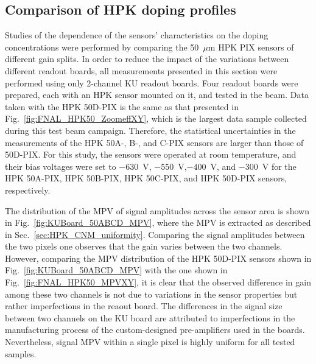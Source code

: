 \documentclass[preprint,1p]{elsarticle}
\begin{document}
\subsection{Comparison of HPK doping profiles}

Studies of the dependence of the sensors' characteristics on the doping
concentrations were performed by comparing the 50~$\mu$m HPK PIX sensors of
different gain splits. In order to reduce the impact of the variations between
different readout boards, all measurements presented in this section were
performed using only 2-channel KU readout boards. Four readout boards were
prepared, each with an HPK sensor mounted on it, and tested in the beam. Data
taken with the HPK 50D-PIX is the same as that presented in
Fig.~\ref{fig:FNAL_HPK50_ZoomeffXY}, which is the largest data sample collected
during this test beam campaign. Therefore, the statistical uncertainties in the
measurements of the HPK 50A-, B-, and C-PIX sensors are larger than those of
50D-PIX. For this study, the sensors were operated at room temperature, and 
their bias voltages were set to $-630$~V, $-550$~V,$-400$~V, and $-300$~V
for the HPK 50A-PIX, HPK 50B-PIX, HPK 50C-PIX, and HPK 50D-PIX sensors, respectively.

The distribution of the MPV of signal amplitudes across the sensor area is shown in
Fig.~\ref{fig:KUBoard_50ABCD_MPV}, where the MPV is extracted as described in
Sec.~\ref{sec:HPK_CNM_uniformity}. Comparing the signal amplitudes between the
two pixels one observes that the gain varies between the two channels. However,
comparing the MPV distribution of the HPK 50D-PIX sensors shown in
Fig.~\ref{fig:KUBoard_50ABCD_MPV} with the one shown in
Fig.~\ref{fig:FNAL_HPK50_MPVXY}, it is clear that the observed difference in gain
among these two channels is not due to variations in the sensor
properties but rather imperfections in the reaout board.
The differences in the signal size between two channels on the KU board are
attributed to imperfections in the manufacturing process of the custom-designed
pre-amplifiers used in the boards. Nevertheless, signal MPV within a
single pixel is highly uniform
for all tested samples. 
\end{document}
